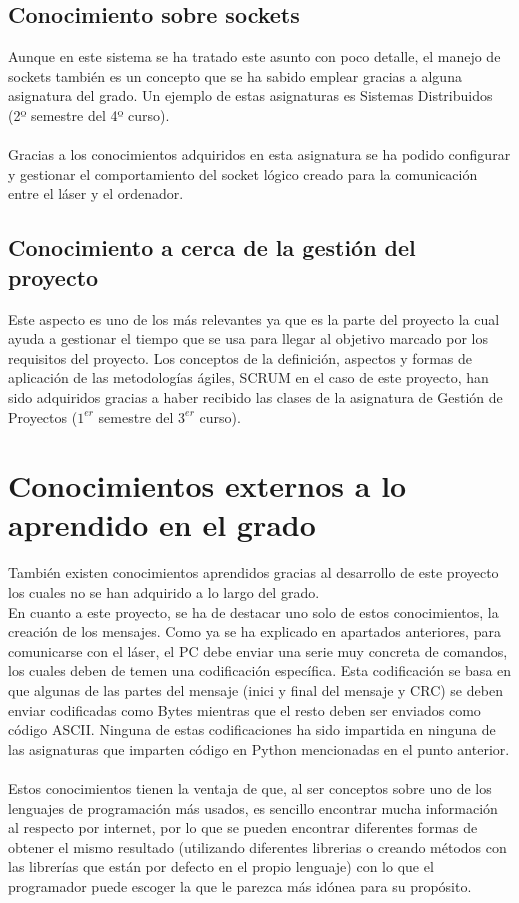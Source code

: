 \subsection{Conocimiento sobre sockets}
Aunque en este sistema se ha tratado este asunto con poco detalle, el manejo de sockets también es un concepto que se ha sabido emplear gracias a alguna asignatura del grado. Un ejemplo de estas asignaturas es Sistemas Distribuidos (2º semestre del 4º curso).\\
\\
Gracias a los conocimientos adquiridos en esta asignatura se ha podido configurar y gestionar el comportamiento del socket lógico creado para la comunicación entre el láser y el ordenador.\\

\subsection{Conocimiento a cerca de la gestión del proyecto}
Este aspecto es uno de los más relevantes ya que es la parte del proyecto la cual ayuda a gestionar el tiempo que se usa para llegar al objetivo marcado por los requisitos del proyecto. Los conceptos de la definición, aspectos y formas de aplicación de las metodologías ágiles, SCRUM en el caso de este proyecto, han sido adquiridos gracias a haber recibido las clases de la asignatura de Gestión de Proyectos ($1^{er}$ semestre del $3^{er}$ curso).\\

\section{Conocimientos externos a lo aprendido en el grado}

También existen conocimientos aprendidos gracias al desarrollo de este proyecto los cuales no se han adquirido a lo largo del grado.\\
En cuanto a este proyecto, se ha de destacar uno solo de estos conocimientos, la creación de los mensajes. Como ya se ha explicado en apartados anteriores, para comunicarse con el láser, el PC debe enviar una serie muy concreta de comandos, los cuales deben de temen una codificación específica. Esta codificación se basa en que algunas de las partes del mensaje (inici y final del mensaje y CRC) se deben enviar codificadas como Bytes mientras que el resto deben ser enviados como código ASCII. Ninguna de estas codificaciones ha sido impartida en ninguna de las asignaturas que imparten código en Python mencionadas en el punto anterior.\\
\\
Estos conocimientos tienen la ventaja de que, al ser conceptos sobre uno de los  lenguajes de programación más usados, es sencillo encontrar mucha información al respecto por internet, por lo que se pueden encontrar diferentes formas de obtener el mismo  resultado (utilizando diferentes librerias o creando métodos con las librerías que están por defecto en el propio lenguaje) con lo que el programador puede escoger la que le parezca más idónea para su propósito.